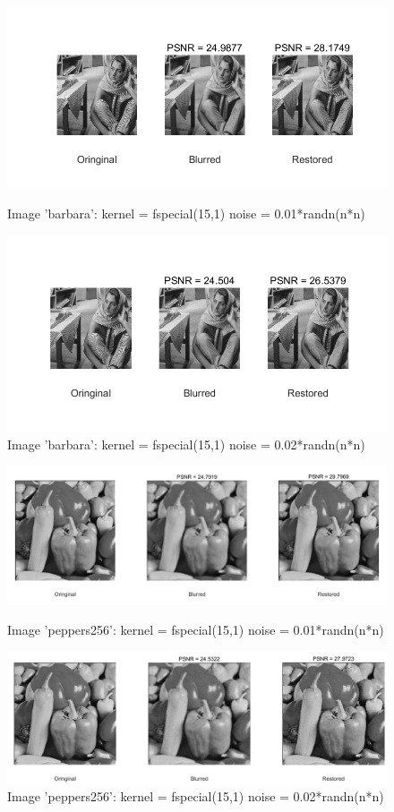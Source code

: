 \documentclass{article}
\begin{document}
\begin{figure}[H]
\centering
\includegraphics[scale=0.8]{1.png}
\caption{Image 'barbara': kernel = fspecial(15,1) noise = 0.01*randn(n*n)}
\centering
\includegraphics[scale=0.8]{2.png}
\caption{Image 'barbara': kernel = fspecial(15,1) noise = 0.02*randn(n*n)}
\end{figure}

\begin{figure}[H]
\centering
\includegraphics[scale=0.4]{3.png}
\caption{Image 'peppers256': kernel = fspecial(15,1) noise = 0.01*randn(n*n)}
\centering
\includegraphics[scale=0.4]{4.png}
\caption{Image 'peppers256': kernel = fspecial(15,1) noise = 0.02*randn(n*n)}
\end{figure}
\end{document}

